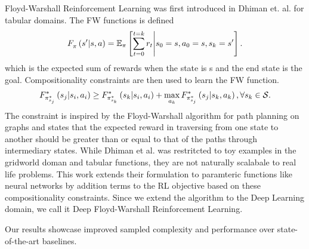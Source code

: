 Floyd-Warshall Reinforcement Learning was first introduced in Dhiman et.
al. for tabular domains. 
The FW functions is defined 
%
\begin{align}
F_{\pi}^{}\left({s'}\middle|{s}, {a}\right) =
\mathbb{E}_{\pi}\left[ \sum_{t=0}^{t=k} r_t \middle\vert s_0 = s, a_0 = s, s_k = s' \right] .
\end{align}%
%
which is the expected sum of rewards when the state is s and the
end state is the goal. Compositionality constraints are then used to
learn the FW function.
%
\begin{align}
\fwargs{\state_i}{\act_i}{\state_j}{\policy^*_{\state_j}}{*}
 \ge 
  \fwargs{\state_i}{\act_i}{\state_k}{\policy^*_{\state_k}}{*}
  + \max_{\act_k}\fwargs{\state_k}{\act_k}{\state_j}{\policy^*_{\state_j}}{*}
  ,\forall \state_k \in \State.
  \label{eq:fwconstraint}
\end{align}%
%
The constraint is inspired by the Floyd-Warshall algorithm for path
planning on graphs and states that the expected reward in traversing
from one state to another should be greater than or equal to that of the
paths through intermediary states.  While Dhiman et al. was restritcted
to toy examples in the gridworld doman and tabular functions, they are
not naturally scalabale to real life problems. This work extends their
formulation to paramteric functions like neural networks by addition
terms to the RL objective based on these compositionality constraints.
Since we extend the algorithm to the Deep Learning domain, we call it
Deep Floyd-Warshall Reinforcement Learning. 


Our results showcase improved sampled complexity and performance over
state-of-the-art baselines. 





